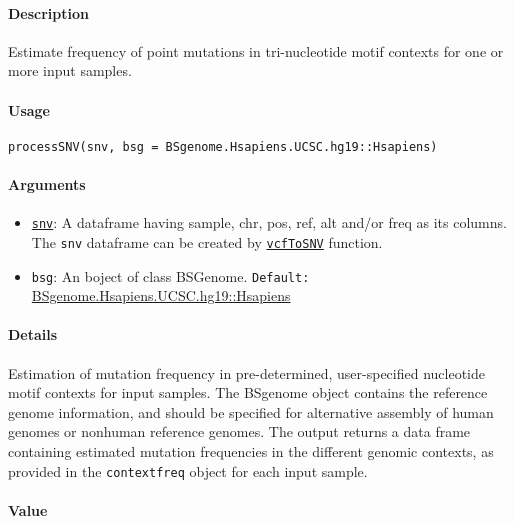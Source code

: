 \documentclass[]{article}
\providecommand{\tightlist}{%
  \setlength{\itemsep}{0pt}\setlength{\parskip}{0pt}}
\let\oldparagraph\paragraph
\renewcommand{\paragraph}[1]{\oldparagraph{#1}\mbox{}}
\begin{document}
\paragraph{\texorpdfstring{\textbf{Description}}{Description}}\label{description-2}

Estimate frequency of point mutations in tri-nucleotide motif contexts for one or more input samples.


\paragraph{\texorpdfstring{\textbf{Usage}}{Usage}}\label{usage-2}

\texttt{processSNV(snv,\ bsg\ =\ BSgenome.Hsapiens.UCSC.hg19::Hsapiens)}

\paragraph{\texorpdfstring{\textbf{Arguments
}}{Arguments }}\label{arguments-2}

\begin{itemize}
\tightlist
\item
  \protect\hyperlink{snv}{\texttt{snv}}: A dataframe having sample, chr,
  pos, ref, alt and/or freq as its columns. The \texttt{snv} dataframe
  can be created by \protect\hyperlink{vcfToSNV}{\texttt{vcfToSNV}}
  function.
\item
  \texttt{bsg}: An boject of class BSGenome. \texttt{Default:}
  \href{https://bioconductor.org/packages/release/data/annotation/html/BSgenome.Hsapiens.UCSC.hg19.html}{BSgenome.Hsapiens.UCSC.hg19::Hsapiens}
\end{itemize}

\paragraph{\texorpdfstring{\textbf{Details}}{Details}}\label{details-2}

Estimation of mutation frequency in pre-determined, user-specified
nucleotide motif contexts for input samples. The BSgenome object
contains the reference genome information, and should be specified for
alternative assembly of human genomes or nonhuman reference genomes. The
output returns a data frame containing estimated mutation frequencies in
the different genomic contexts, as provided in the \texttt{contextfreq}
object for each input sample.

\hypertarget{contextfreq}{\paragraph{\texorpdfstring{\textbf{Value}}{Value}}\label{contextfreq}}
\end{document}
